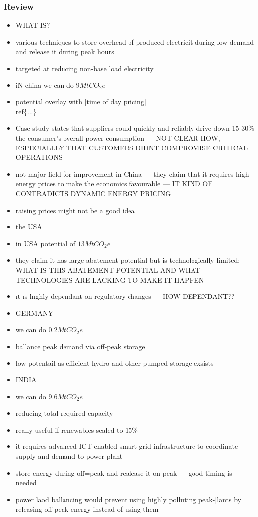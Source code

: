 \documentclass[11pt, twocolumn]{article}
\begin{document}
\subsubsection{Review}
\begin{itemize}
\item WHAT IS?
\item various techniques to store overhead of produced electricit during low demand and release it during peak hours
\item targeted at reducing non-base load electricity


\item iN china we can do $9 Mt CO_2e$
\item potential overlay with  [time of day pricing]\\ref\{...\}
\item Case study states that suppliers could quickly and reliably drive down 15-30\% the consumer's overall power consumption --- NOT CLEAR HOW, ESPECIALLLY THAT CUSTOMERS DIDNT COMPROMISE CRITICAL OPERATIONS
\item not major field for improvement in China --- they claim that it requires high energy prices to make the economics favourable --- IT KIND OF CONTRADICTS DYNAMIC ENERGY PRICING
\item raising prices might not be a good idea

\item the USA
\item in USA potential of $13 MtCO_2e$
\item they claim it has large abatement potential but is technologically limited: WHAT IS THIS ABATEMENT POTENTIAL AND WHAT TECHNOLOGIES ARE LACKING TO MAKE IT HAPPEN
\item it is highly dependant on regulatory changes --- HOW DEPENDANT??

\item GERMANY
\item we can do $0.2 Mt CO_2e$
\item ballance peak demand via off-peak storage
\item low potentail as efficient hydro and other pumped storage exsists


\item INDIA
\item we can do $9.6 Mt CO_2e$
\item reducing total required capacity
\item really useful if renewables scaled to 15\%
\item it requires advanced ICT-enabled smart grid infrastructure to coordinate supply and demand to power plant
\item store energy during off=peak and realease it on-peak --- good timing is needed
\item power laod ballancing would prevent using highly polluting peak-[lants by releasing off-peak energy instead of using them

\end{itemize}
\end{document}
